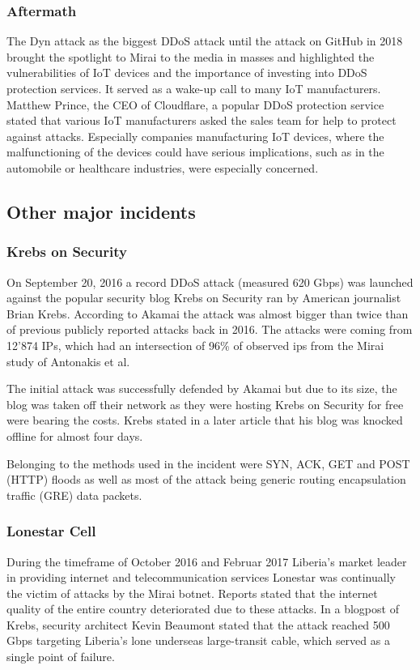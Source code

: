 	\subsubsection{Aftermath}
	The Dyn attack as the biggest DDoS attack until the attack on GitHub in 2018 brought the spotlight to Mirai to the media in masses and highlighted the vulnerabilities of IoT devices and the importance of investing into DDoS protection services. It served as a wake-up call to many IoT manufacturers. Matthew Prince, the CEO of Cloudflare, a popular DDoS protection service stated that various IoT manufacturers asked the sales team for help to protect against attacks. Especially companies manufacturing IoT devices, where the malfunctioning of the devices could have serious implications, such as in the automobile or healthcare industries, were especially concerned. \cite{Melendez17}
	
	\subsection{Other major incidents}
		\subsubsection{Krebs on Security}
		On September 20, 2016 a record DDoS attack (measured 620 Gbps) was launched against the popular security blog Krebs on Security ran by American journalist Brian Krebs. According to Akamai the attack was almost bigger than twice than of previous publicly reported attacks back in 2016. \cite{Akamai16} The attacks were coming from 12'874 IPs, which had an intersection of 96\% of observed ips from the Mirai study of Antonakis et al. \cite{Antonakakis17}
	
The initial attack was successfully defended by Akamai but due to its size, the blog was taken off their network as they were hosting Krebs on Security for free were bearing the costs. \cite{Osborne16} Krebs stated in a later article that his blog was knocked offline for almost four days. \cite{Krebs19}

Belonging to the methods used in the incident were SYN, ACK, GET and POST (HTTP) floods as well as most of the attack being generic routing encapsulation traffic (GRE) data packets. \cite{Antonakakis17}

	
		\subsubsection{Lonestar Cell}
		During the timeframe of October 2016 and Februar 2017 Liberia's market leader in providing internet and telecommunication services Lonestar was continually the victim of attacks by the Mirai botnet. Reports stated that the internet quality of the entire country deteriorated due to these attacks. \cite{Antonakakis17} In a blogpost of Krebs, security architect Kevin Beaumont stated that the attack reached 500 Gbps targeting Liberia's lone underseas large-transit cable, which served as a single point of failure. \cite{Krebs16}
	
